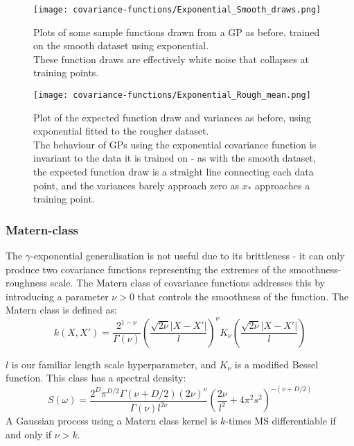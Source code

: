 \begin{figure}[H]
    \texttt{[image: covariance-functions/Exponential\_Smooth\_draws.png]}
    \caption{
        Plots of some sample functions drawn from a GP as before, trained on the smooth dataset using exponential. \\
        These function draws are effectively white noise that collapses at training points.
    }
\end{figure}

\begin{figure}[H]
    \texttt{[image: covariance-functions/Exponential\_Rough\_mean.png]}
    \caption{
        Plot of the expected function draw and variances as before, using exponential fitted to the rougher dataset. \\
        The behaviour of GPs using the exponential covariance function is invariant to the data it is trained on - as with the smooth dataset, the expected function draw is a straight line connecting each data point, and the variances barely approach zero as $x_*$ approaches a training point. 
    }
\end{figure}


\subsubsection{Matern-class}
The $\gamma$-exponential generalisation is not useful due to its brittleness - it can only produce two covariance functions representing the extremes of the smoothness-roughness scale. The Matern class of covariance functions addresses this by introducing a parameter $\nu > 0$ that controls the smoothness of the function. The Matern class is defined as:
\begin{equation*}
    k(X,X') = \frac{2^{1 - \nu}}{\Gamma(\nu)}\left(\frac{\sqrt{2\nu}|X - X'|}{l}\right)^{\nu}K_{\nu}\left(\frac{\sqrt{2\nu}|X - X'|}{l}\right)
\end{equation*}

$l$ is our familiar length scale hyperparameter, and $K_{\nu}$ is a modified Bessel function. This class has a spectral density:
\begin{equation*}
    S(\omega) = \frac{2^D \pi^{D/2} \Gamma(\nu + D/2) (2\nu)^\nu}{\Gamma(\nu) l^{2\nu}} \left( \frac{2\nu}{l^2} + 4 \pi^2 s^2 \right)^{-(\nu + D/2)} 
\end{equation*}
A Gaussian process using a Matern class kernel is $k$-times MS differentiable if and only if $\nu > k$. 

